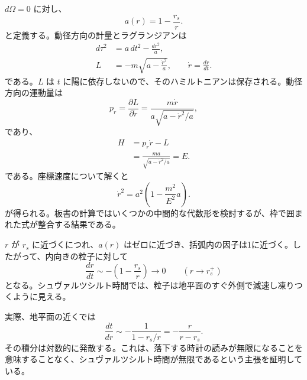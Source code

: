\(d\Omega=0\) に対し、
\begin{equation}
a(r)=1-\frac{r_s}{r}.
\label{eq:l5-a-def}
\end{equation}
と定義する。動径方向の計量とラグランジアンは
\begin{align}
d\tau^2&=a\,dt^2-\frac{dr^2}{a},\\
L&=-m\sqrt{a-\frac{\dot r^2}{a}},
\qquad
\dot r=\frac{dr}{dt}.
\label{eq:l5-radial-lagrangian}
\end{align}
である。\(L\) は \(t\) に陽に依存しないので、そのハミルトニアンは保存される。動径方向の運動量は
\begin{equation}
p_r=\frac{\partial L}{\partial\dot r}
=\frac{m\dot r}{a\sqrt{a-\dot r^2/a}},
\label{eq:l5-radial-momentum}
\end{equation}
であり、
\begin{align}
H
&=p_r\dot r-L\\
&=\frac{ma}{\sqrt{a-\dot r^2/a}}
=E.
\label{eq:l5-radial-energy}
\end{align}
である。座標速度について解くと
\begin{equation}
\boxed{
\dot r^2
=a^2\left(1-\frac{m^2}{E^2}a\right).
}
\label{eq:l5-radial-velocity}
\end{equation}
が得られる。板書の計算ではいくつかの中間的な代数形を検討するが、枠で囲まれた式が整合する結果である。

\(r\) が \(r_s\) に近づくにつれ、\(a(r)\) はゼロに近づき、括弧内の因子は1に近づく。したがって、内向きの粒子に対して
\begin{equation}
\frac{dr}{dt}
\sim -\left(1-\frac{r_s}{r}\right)
\longrightarrow 0
\qquad(r\longrightarrow r_s^+)
\label{eq:l5-infall-freeze}
\end{equation}
となる。シュヴァルツシルト時間では、粒子は地平面のすぐ外側で減速し凍りつくように見える。

\begin{classroomqa}
\end{classroomqa}

実際、地平面の近くでは
\begin{equation}
\frac{dt}{dr}
\sim-\frac{1}{1-r_s/r}
=-\frac{r}{r-r_s}.
\end{equation}
その積分は対数的に発散する。これは、落下する時計の読みが無限になることを意味することなく、シュヴァルツシルト時間が無限であるという主張を証明している。

